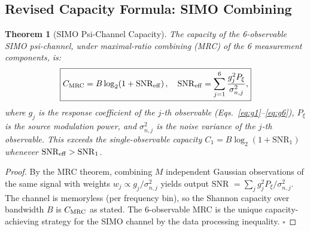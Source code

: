 \documentclass[aps,prd,twocolumn,superscriptaddress,nofootinbib]{revtex4-2}
\newcommand{\SNR}{\mathrm{SNR}}
\newtheorem{theorem}{Theorem}
\begin{document}
\subsection{Revised Capacity Formula: SIMO Combining}

\begin{theorem}[SIMO Psi-Channel Capacity]
\label{thm:SIMO-cap}
The capacity of the 6-observable SIMO psi-channel, under maximal-ratio
combining (MRC) of the 6 measurement components, is:
\begin{equation}
\boxed{
C_{\rm MRC} = B \log_2\!\left(1 + \SNR_{\rm eff}\right),
\quad
\SNR_{\rm eff} = \sum_{j=1}^{6} \frac{g_j^2 P_{\xi}}{\sigma_{n,j}^2},
}
\label{eq:C-MRC}
\end{equation}
where $g_j$ is the response coefficient of the $j$-th observable
(Eqs.~\eqref{eq:g1}--\eqref{eq:g6}), $P_\xi$ is the source modulation
power, and $\sigma_{n,j}^2$ is the noise variance of the $j$-th observable.
This exceeds the single-observable capacity $C_1 = B\log_2(1 + \SNR_1)$
whenever $\SNR_{\rm eff} > \SNR_1$.
\end{theorem}

\begin{proof}
By the MRC theorem, combining $M$ independent Gaussian observations of
the same signal with weights $w_j \propto g_j/\sigma_{n,j}^2$ yields
output SNR $= \sum_j g_j^2 P_\xi / \sigma_{n,j}^2$. The channel is
memoryless (per frequency bin), so the Shannon capacity over bandwidth
$B$ is $C_{\rm MRC}$ as stated. The 6-observable MRC is the unique
capacity-achieving strategy for the SIMO channel by the data processing
inequality. $\square$
\end{proof}
\end{document}

